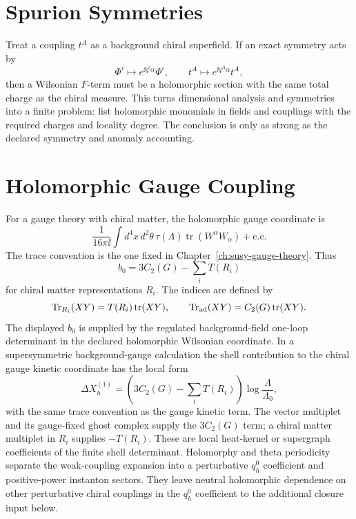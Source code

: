 \section{Spurion Symmetries}

Treat a coupling \(t^A\) as a background chiral superfield.  If an exact
symmetry acts by
\[
  \Phi^i\mapsto e^{\ii q^i\alpha}\Phi^i,\qquad
  t^A\mapsto e^{\ii q^A\alpha}t^A,
\]
then a Wilsonian \(F\)-term must be a holomorphic section with the same total
charge as the chiral measure.  This turns dimensional analysis and
symmetries into a finite problem: list holomorphic monomials in fields and
couplings with the required charges and locality degree.  The conclusion is
only as strong as the declared symmetry and anomaly accounting.

\section{Holomorphic Gauge Coupling}

For a gauge theory with chiral matter, the holomorphic gauge coordinate is
\[
  \frac{1}{16\pi\ii}\int d^4x\,d^2\theta\,
  \tau(\Lambda)\operatorname{tr}(W^\alpha W_\alpha)+\text{c.c.}
\]
The trace convention is the one fixed in
Chapter~\ref{ch:susy-gauge-theory}.  Thus
\[
  b_0=3C_2(G)-\sum_iT(R_i)
\]
for chiral matter representations \(R_i\).  The indices are defined by
\[
  \operatorname{Tr}_{R_i}(XY)=T(R_i)\operatorname{tr}(XY),
  \qquad
  \operatorname{Tr}_{\rm ad}(XY)=C_2(G)\operatorname{tr}(XY).
\]
The displayed \(b_0\) is supplied by the regulated background-field one-loop
determinant in the declared holomorphic Wilsonian coordinate.  In a
supersymmetric background-gauge calculation the shell contribution to the
chiral gauge kinetic coordinate has the local form
\begin{equation}
  \Delta X_h^{(1)}
  =
  \left(3C_2(G)-\sum_iT(R_i)\right)\log\frac{\Lambda}{\Lambda_0},
  \label{eq:susy-holomorphic-one-loop-shell-coefficient}
\end{equation}
with the same trace convention as the gauge kinetic term.  The vector
multiplet and its gauge-fixed ghost complex supply the \(3C_2(G)\) term; a
chiral matter multiplet in \(R_i\) supplies \(-T(R_i)\).  These are local
heat-kernel or supergraph coefficients of the finite shell determinant.
Holomorphy and theta periodicity separate the weak-coupling expansion into a
perturbative \(q_h^0\) coefficient and positive-power instanton sectors.  They
leave neutral holomorphic dependence on other perturbative chiral couplings in
the \(q_h^0\) coefficient to the additional closure input below.


